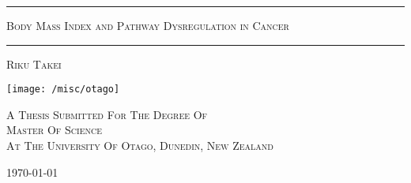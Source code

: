 \begin{titlepage}

\centering

\rule[2.0mm]{\textwidth}{0.5mm}

\begin{doublespace}
    {\Huge \scshape Body Mass Index and Pathway Dysregulation in Cancer}
\end{doublespace}

\rule[2.0mm]{\textwidth}{0.5mm}

\vspace{2.0mm}
{\Large \scshape Riku Takei}

\vfill

\texttt{[image: /misc/otago]}

\vfill

{\normalsize \scshape A Thesis Submitted For The Degree Of\\}
{\Large \scshape Master Of Science\\}
\vspace{2.0mm}
{\normalsize \scshape At The University Of Otago, Dunedin, New Zealand \\}

\vspace{10.0mm}
{\normalsize \today}

\end{titlepage}
